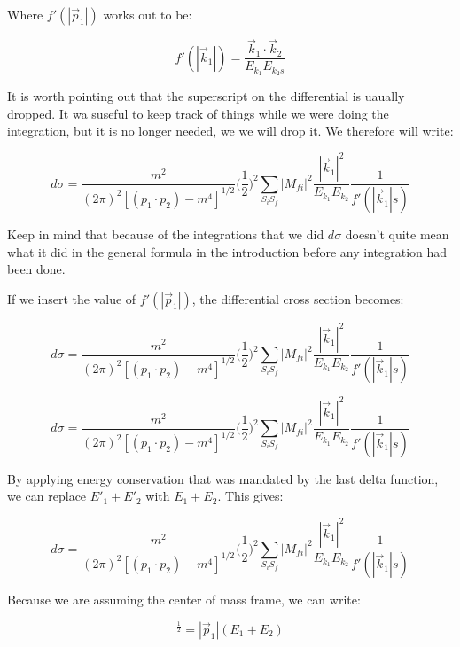 \documentclass[a4]{article}
\begin{document}
    Where $f' (|\vec{p}_1|)$ works out to be:

    \[
        f' (|\vec{k}_1|) = \frac{\vec{k}_1 \cdot \vec{k}_2}{E_{k_1} E_{k_2s}}
    \]

    It is worth pointing out that the superscript on the differential is uaually dropped. It wa suseful to keep track of things while we were doing the integration, but it is no longer needed, we we will drop it. 
    We therefore will write: 

    \begin{equation}
        d \sigma = \frac{m^2}{(2 \pi)^2 [(p_1 \cdot p_2) - m^4]^{1/2}} \bigg( \frac{1}{2} \bigg)^2 \sum_{S_i S_f} |M_{fi}|^2 \frac{|\vec{k}_1|^2}{E_{k_1} E_{k_2}} \frac{1}{f' (|\vec{k}_1|s)}
    \end{equation}

    Keep in mind that because of the integrations that we did $d \sigma$ doesn't quite mean what it did in the general formula in the introduction before any  integration had been done.

    If we insert the value of $f' (|\vec{p}_1|)$, the differential cross section becomes:

    \begin{equation}
        d \sigma = \frac{m^2}{(2 \pi)^2 [(p_1 \cdot p_2) - m^4]^{1/2}} \bigg( \frac{1}{2} \bigg)^2 \sum_{S_i S_f} |M_{fi}|^2 \frac{|\vec{k}_1|^2}{E_{k_1} E_{k_2}} \frac{1}{f' (|\vec{k}_1|s)}
    \end{equation}

    \begin{equation}
        d \sigma = \frac{m^2}{(2 \pi)^2 [(p_1 \cdot p_2) - m^4]^{1/2}} \bigg( \frac{1}{2} \bigg)^2 \sum_{S_i S_f} |M_{fi}|^2 \frac{|\vec{k}_1|^2}{E_{k_1} E_{k_2}} \frac{1}{f' (|\vec{k}_1|s)}
    \end{equation}

    By applying energy conservation that was mandated by the last delta function, we can replace $E'_1 + E'_2$ with $E_1 + E_2$. This gives:

    \begin{equation}
        d \sigma = \frac{m^2}{(2 \pi)^2 [(p_1 \cdot p_2) - m^4]^{1/2}} \bigg( \frac{1}{2} \bigg)^2 \sum_{S_i S_f} |M_{fi}|^2 \frac{|\vec{k}_1|^2}{E_{k_1} E_{k_2}} \frac{1}{f' (|\vec{k}_1|s)}
    \end{equation}

    Because we are assuming the center of mass frame, we can write:

    \begin{equation}
        [(p_1 \cdot p_2)^2 - m_1^2 m_2^2]^\frac{1}{2} = |\vec{p}_1| (E_1 + E_2)
    \end{equation}
\end{document}
